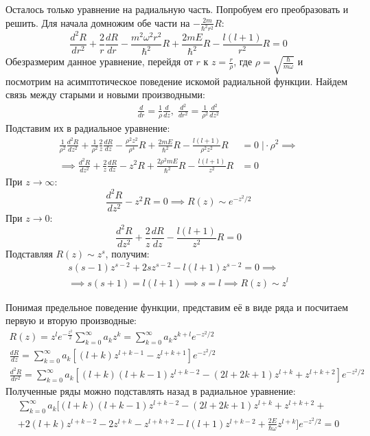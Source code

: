Осталось только уравнение на радиальную часть. Попробуем его преобразовать и решить. Для начала домножим обе части на $-\frac{2m}{\hbar^2r^2}R$:
\[
\frac{d^2R}{dr^2} + \frac{2}{r}\frac{dR}{dr} - \frac{m^2\omega^2r^2}{\hbar^2}R + \frac{2mE}{\hbar^2}R - \frac{l(l+1)}{r^2}R = 0
\]
Обезразмерим данное уравнение, перейдя от $r$ к $z = \frac{r}{\rho}$, где $\rho = \sqrt{\frac{\hbar}{m\omega}}$ и посмотрим на асимптотическое поведение искомой радиальной функции. Найдем связь между старыми и новыми производными:
\begin{gather*}
    \frac{d}{dr} = \frac{1}{\rho}\frac{d}{dz}, \; \frac{d^2}{dr^2} = \frac{1}{\rho^2}\frac{d^2}{dz^2}
\end{gather*}
Подставим их в радиальное уравнение:
\begin{align*}
    \frac{1}{\rho^2}\frac{d^2R}{dz^2} + \frac{1}{\rho^2}\frac{2}{z}\frac{dR}{dz} - \frac{\rho^2 z^2}{\rho^4}R + \frac{2mE}{\hbar^2}R - \frac{l(l+1)}{\rho^2z^2}R &=0 \; \Bigg| \cdot \rho^2 \implies \\
    \implies \frac{d^2R}{dz^2} + \frac{2}{z}\frac{dR}{dz} - z^2R + \frac{2\rho^2mE}{\hbar^2}R - \frac{l(l+1)}{z^2}R &= 0
\end{align*}
При $z \to \infty$:
\[
\frac{d^2R}{dz^2} - z^2R = 0 \implies R(z) \sim e^{-z^2/2}
\]
При $z \to 0$:
\[
    \frac{d^2R}{dz^2} + \frac{2}{z}\frac{dR}{dz} - \frac{l(l+1)}{z^2}R = 0
\]
Подставляя $R(z) \sim z^s$, получим:
\begin{align*} 
    s(s-1)z^{s-2} + 2sz^{s-2} - l(l+1)z^{s-2} = 0 \implies \\
    \implies s(s+1) = l(l+1) \implies s = l \implies R(z) \sim z^l
\end{align*}

Понимая предельное поведение функции, представим её в виде ряда и посчитаем первую и вторую производные:
\begin{gather*}
    R(z) = z^l e^{-\frac{z^2}{2}}\sum_{k=0}^\infty a_k z^k = \sum_{k=0}^\infty a_k z^{k+l} e^{-z^2/2} \\
    \frac{dR}{dz} = \sum_{k=0}^\infty a_k\left[(l+k)z^{l+k-1} - z^{l+k+1}\right]e^{-z^2/2} \\
    \frac{d^2R}{dr^2} = \sum_{k = 0}^\infty a_k \left[(l+k)(l+k-1)z^{l+k-2} - (2l+2k+1)z^{l+k} + z^{l+k+2}\right]e^{-z^2/2}
\end{gather*}
Полученные ряды можно подставлять назад в радиальное уравнение:
\begin{gather*}
    \sum_{k=0}^\infty a_k \biggl[ (l+k)(l+k-1)z^{l+k-2} - (2l+2k+1)z^{l+k}+z^{l+k+2} + \\ 
    + 2(l+k)z^{l+k-2} - 2z^{l+k} - z^{l+k+2} - l(l+1)z^{l+k-2} + \frac{2E}{\hbar\omega} z^{l+k} \biggr] e^{-z^2/2} = 0
\end{gather*}

